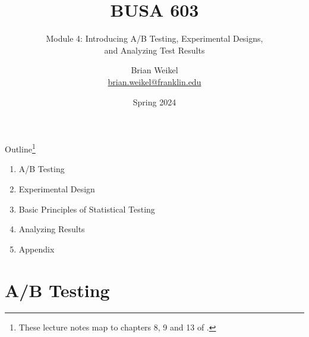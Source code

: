 \documentclass[pdf]{beamer}
\title{BUSA 603}
\subtitle{Module 4:   Introducing A/B Testing, Experimental Designs, \\ and Analyzing Test Results}
\theoremstyle{remark}
\theoremstyle{definition}
\begin{document}
\author[B. Weikel, Franklin University]{
	\begin{tabular}{c} 
	\Large
	Brian Weikel\\
    \footnotesize \href{mailto:brian.weikel@franklin.edu}{brian.weikel@franklin.edu}
    \vspace{1ex}
\end{tabular}
\vspace{-4ex}}


\date{Spring 2024}%

\begin{noheadline}
\begin{frame}[t]\maketitle\end{frame}
\end{noheadline}

\begin{frame}[t]{Outline\footnote{These lecture notes map to chapters 8, 9 and 13 of \cite{davis2022}.}}
\begin{enumerate}
\item  A/B Testing
\vspace{1.5ex}
\item Experimental Design
\vspace{1.5ex}
\item Basic Principles of Statistical Testing
\vspace{1.5ex}
\item Analyzing Results
\vspace{1.5ex}
\item Appendix
\end{enumerate}
\end{frame}

\section{A/B Testing}
\end{document}
